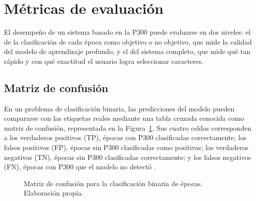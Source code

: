 \section[MÉTRICAS DE EVALUACIÓN]{Métricas de evaluación}
\label{sec:metricas}

El desempeño de un sistema basado en la P300 puede evaluarse en dos niveles: el de la
clasificación de cada época como objetivo o no objetivo, que mide la calidad del modelo de
aprendizaje profundo, y el del sistema completo, que mide qué tan rápido y con qué exactitud el
usuario logra seleccionar caracteres.

\subsection{Matriz de confusión}

En un problema de clasificación binaria, las predicciones del modelo pueden compararse con las
etiquetas reales mediante una tabla cruzada conocida como matriz de confusión, representada en la
Figura~\ref{fig:confusion}. Sus cuatro celdas corresponden a los verdaderos positivos (TP), épocas
con P300 clasificadas correctamente; los falsos positivos (FP), épocas sin P300 clasificadas como
positivas; los verdaderos negativos (TN), épocas sin P300 clasificadas correctamente; y los falsos
negativos (FN), épocas con P300 que el modelo no detectó \cite{fawcett2006}.

\begin{figure}[htbp]
\centering
{}
\caption{Matriz de confusión para la clasificación binaria de épocas. Elaboración propia.}
\label{fig:confusion}
\end{figure}

